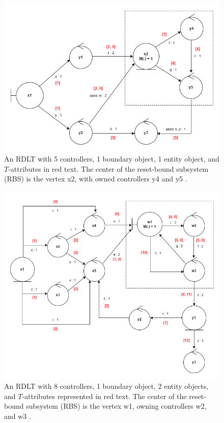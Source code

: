 \documentclass[12pt]{article}
\begin{document}
        \begin{figure}[h]
            \centering
            \includegraphics[scale=0.65]{figures/RDLT1.png}
            \caption{An RDLT with 5 controllers, 1 boundary object, 1 entity object, and $T$-attributes in red text. The center of the reset-bound subsystem (RBS) is the vertex x2, with owned controllers y4 and y5 \cite{yiu}.}
            \label{rdlt1}
        \end{figure} \par

        \begin{figure}[h]
            \centering
            \includegraphics[scale=0.65]{figures/RDLT2_PJS.png}
            \caption{An RDLT with 8 controllers, 1 boundary object, 2 entity objects, and $T$-attributes represented in red text. The center of the reset-bound subsystem (RBS) is the vertex w1, owning controllers w2, and w3 \cite{malinao-pjs}.}
            \label{rdlt2}
        \end{figure} \par
\end{document}
